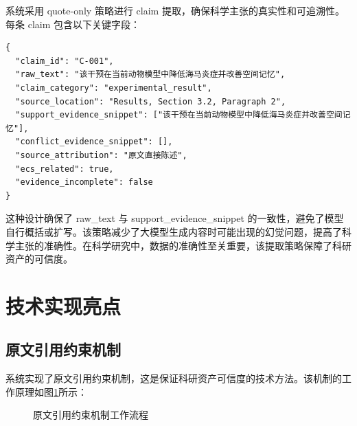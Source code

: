 ﻿\documentclass[a4paper,12pt]{article}
\begin{document}
系统采用 quote-only 策略进行 claim 提取，确保科学主张的真实性和可追溯性。每条 claim 包含以下关键字段：

\begin{center}
\begin{minipage}{0.9\textwidth}
\begin{tcolorbox}[colback=gray!5, colframe=black!30, title=Claim数据结构示例, fonttitle=\bfseries\ttfamily]
\begin{verbatim}
{
  "claim_id": "C-001",
  "raw_text": "该干预在当前动物模型中降低海马炎症并改善空间记忆",
  "claim_category": "experimental_result",
  "source_location": "Results, Section 3.2, Paragraph 2",
  "support_evidence_snippet": ["该干预在当前动物模型中降低海马炎症并改善空间记忆"],
  "conflict_evidence_snippet": [],
  "source_attribution": "原文直接陈述",
  "ecs_related": true,
  "evidence_incomplete": false
}
\end{verbatim}
\end{tcolorbox}
\end{minipage}
\end{center}

这种设计确保了 raw\_text 与 support\_evidence\_snippet 的一致性，避免了模型自行概括或扩写。该策略减少了大模型生成内容时可能出现的幻觉问题，提高了科学主张的准确性。在科学研究中，数据的准确性至关重要，该提取策略保障了科研资产的可信度。

\section{技术实现亮点}

\subsection{原文引用约束机制}

系统实现了原文引用约束机制，这是保证科研资产可信度的技术方法。该机制的工作原理如图\ref{fig:quote_mechanism}所示：

\begin{figure}[H]
\centering
{}
\caption{原文引用约束机制工作流程}
\label{fig:quote_mechanism}
\end{figure}
\end{document}
